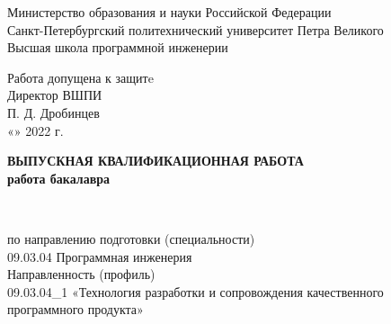 \begin{titlepage}

  \begin{center} %




    Министерство образования и науки Российской Федерации\\Санкт-Петербургский политехнический университет Петра Великого\\
    Высшая школа программной инженерии\\[0.9cm]
    {
    \begin{flushright}
      Работа допущена к защитe\\
      Директор ВШПИ\\
      \underline{\hspace{2.2cm}} П. Д. Дробинцев\\
      «\underline{\hspace{0.8cm}}»\underline{\hspace{3cm}} 2022 г.\\[1.8cm]
    \end{flushright}
    }
    {\Large \bfseries ВЫПУСКНАЯ КВАЛИФИКАЦИОННАЯ РАБОТА}\\
    {\Large \bfseries работа бакалавра}\\[0.8cm]

    \bigskip
    \bigskip

    {\Large \bfseries \MakeUppercase{\Theme}}\\[0.4cm] %

    {
    \begin{flushleft}
      по направлению подготовки (специальности)\\
      09.03.04 Программная инженерия\\[0.2cm]
      Направленность (профиль)\\
      09.03.04\_1 «Технология разработки и сопровождения качественного программного продукта»\\[0.6cm]
    \end{flushleft}
    }


\end{center}
\end{titlepage}
